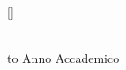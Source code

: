 \begin{titlepage}
\begin{center}
\begin{minipage}{\textwidth}
\begin{flushright}
\begin{minipage}{0.3\textwidth}
{\begin{tabbing}
\StrLen{\correlatore}[\correlatoreLen]%
\end{tabbing}
}
\end{minipage}
\end{flushright}
\end{minipage}\\
\vspace{\spazioSopraAnno} %
\hbox to \textwidth{\hrulefill}\vspace{-0.2cm}
{\large \sc Anno Accademico \anno}
\end{center}
\end{titlepage}
\endinput
